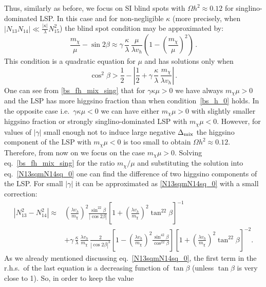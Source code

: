\documentclass[12pt,twoside]{article}
\begin{document}
Thus, similarly as before, we focus on SI blind spots with 
$\Omega h^2\approx0.12$ 
for singlino-dominated LSP. In this case and for non-negligible $\kappa$ 
(more precisely, when $|N_{13}N_{14}|\ll\frac{|\kappa|}{\lambda}N_{15}^2$) 
the blind spot condition may be approximated by:
%
%
\begin{equation}
\label{bs_fh_mix_sing}
\frac{m_\chi}{\mu}-\sin2\beta\approx\gamma\,\frac{\kappa}{\lambda}\,
\frac{\mu}{\lambda v_h}
\left(1-\left(\frac{m_\chi}{\mu}\right)^2\right)\,.
\end{equation}
%
%
This condition is a quadratic equation for $\mu$ and has solutions 
only when
%
%
\begin{equation}
\cos^2\beta>\frac12
-\left|\frac12+\gamma\,\frac{\kappa}{\lambda}\,\frac{m_\chi}{\lambda v_h}\right|
\,.
\label{gamma_BS_fh_mix}
\end{equation}
%
One can see from \eqref{bs_fh_mix_sing} that for $\gamma\kappa\mu>0$ we have 
always $m_\chi\mu>0$ and the LSP has more higgsino fraction than when 
condition~\eqref{bs_h_0} holds.
In the opposite case i.e.~$\gamma\kappa\mu<0$ 
we can have either $m_\chi\mu>0$ with slightly smaller higgsino fraction or 
strongly singlino-dominated LSP with $m_\chi\mu<0$. However, for values of $|\gamma|$ small enough not to induce large negative $\Delta_{\rm mix}$
the higgsino component of the LSP with $m_\chi\mu<0$ is too small to obtain $\Omega h^2\approx 0.12$. Therefore, from now on we focus on the case
$m_\chi\mu>0$. 
Solving eq.~\eqref{bs_fh_mix_sing} for the ratio $m_\chi/\mu$ and substituting 
the solution into eq.~\eqref{N13sqmN14sq_0} one can find the difference 
of two higgsino components of the LSP. For small $|\gamma|$ it can be 
approximated as \eqref{N13sqmN14sq_0} with a small correction:
%
%
\begin{align}
\label{N13sqmN14sq_mix}
\left|N_{13}^2-N_{14}^2\right|
\approx
&\left(\frac{\lambda v_h}{m_\chi}\right)^2
\frac{\sin^22\beta}{|\cos2\beta|}
\left[1+\left(\frac{\lambda v_h}{m_\chi}\right)^2\tan^22\beta\right]^{-1}
\nonumber\\
&+
\gamma\,\frac{\kappa}{\lambda}\,\frac{\lambda v_h}{m_\chi}\,
\frac{2}{|\cos2\beta|^3}
\left[1-\left(\frac{\lambda v_h}{m_\chi}\right)^2
\frac{\sin^42\beta}{\cos^22\beta}\right]
\left[1+\left(\frac{\lambda v_h}{m_\chi}\right)^2\tan^22\beta\right]^{-2}
.
\end{align}
%
%
As we already mentioned discussing eq.~\eqref{N13sqmN14sq_0}, the first term 
in the r.h.s.\ of the last equation is a decreasing function of $\tan\beta$
(unless $\tan\beta$ is very close to 1). So, in order to keep the value 
\end{document}
